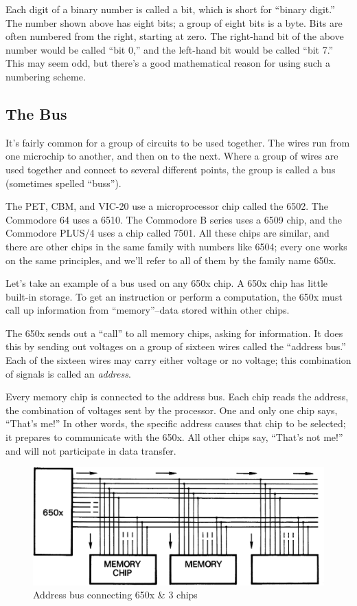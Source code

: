 \documentclass[11pt,a4paper,titlepage]{memoir}
\begin{document}
Each digit of a binary number is called a bit, which is short for ``binary digit.'' The number shown above has eight bits; a group of eight bits is a byte. Bits are often numbered from the right, starting at zero. The right-hand bit of the above number would be called ``bit 0,'' and the left-hand bit would be called ``bit 7.'' This may seem odd, but there's a good mathematical reason for using such a numbering scheme.
\subsection{The Bus}
It's fairly common for a group of circuits to be used together. The wires run from one microchip to another, and then on to the next. Where a group of wires are used together and connect to several different points, the group is called a bus (sometimes spelled ``buss'').

The PET, CBM, and VIC-20 use a microprocessor chip called the 6502. The Commodore 64 uses a 6510. The Commodore B series uses a 6509 chip, and the Commodore PLUS/4 uses a chip called 7501. All these chips are similar, and there are other chips in the same family with numbers like 6504; every one works on the same principles, and we'll refer to all of them by the family name 650x.

Let's take an example of a bus used on any 650x chip. A 650x chip has little built-in storage. To get an instruction or perform a computation, the 650x must call up information from ``memory''--data stored within other chips.

The 650x sends out a ``call'' to all memory chips, asking for information. It does this by sending out voltages on a group of sixteen wires called the ``address bus.'' Each of the sixteen wires may carry either voltage or no voltage; this combination of signals is called an \emph{address}.

Every memory chip is connected to the address bus. Each chip reads the address, the combination of voltages sent by the processor. One and only one chip says, ``That's me!'' In other words, the specific address causes that chip to be selected; it prepares to communicate with the 650x. All other chips say, ``That's not me!'' and will not participate in data transfer.

\begin{figure}[h]
	\centering
	\includegraphics[width=1\linewidth]{screenshot003}
	\caption{Address bus connecting 650x \& 3 chips}
	\label{fig:screenshot003}
\end{figure}
\end{document}
